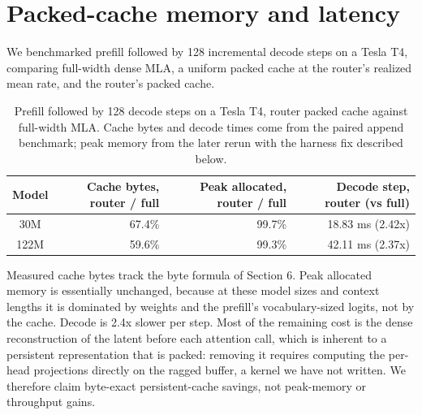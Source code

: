 \documentclass[11pt]{article}
\begin{document}
\section{Packed-cache memory and latency}

We benchmarked prefill followed by 128 incremental decode steps on a Tesla T4, comparing full-width dense MLA, a uniform packed cache at the router's realized mean rate, and the router's packed cache.

\begin{table}[t]
\centering
\caption{Prefill followed by 128 decode steps on a Tesla T4, router packed cache against full-width MLA. Cache bytes and decode times come from the paired append benchmark; peak memory from the later rerun with the harness fix described below.}
\small
\begin{tabular}{crrr}
\toprule
Model & Cache bytes, router / full & Peak allocated, router / full & Decode step, router (vs full) \\
\midrule
30M & 67.4\% & 99.7\% & 18.83 ms (2.42x) \\
122M & 59.6\% & 99.3\% & 42.11 ms (2.37x) \\
\bottomrule
\end{tabular}
\end{table}

Measured cache bytes track the byte formula of Section 6. Peak allocated memory is essentially unchanged, because at these model sizes and context lengths it is dominated by weights and the prefill's vocabulary-sized logits, not by the cache. Decode is 2.4x slower per step. Most of the remaining cost is the dense reconstruction of the latent before each attention call, which is inherent to a persistent representation that is packed: removing it requires computing the per-head projections directly on the ragged buffer, a kernel we have not written. We therefore claim byte-exact persistent-cache savings, not peak-memory or throughput gains.
\end{document}
